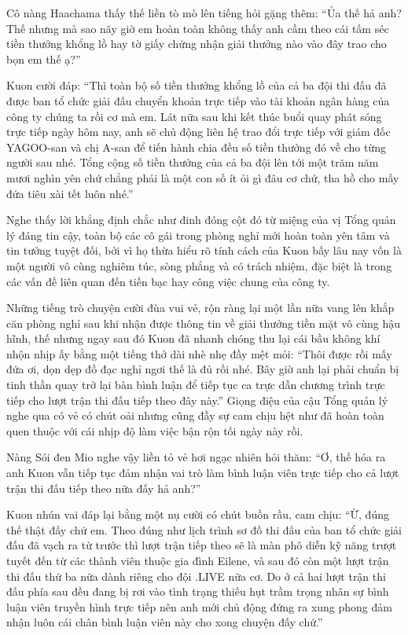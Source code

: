 \documentclass[../main.tex]{subfiles}
\begin{document}
Cô nàng Haachama thấy thế liền tò mò lên tiếng hỏi gặng thêm: ``Ủa thế hả anh? Thế nhưng mà sao nãy giờ em hoàn toàn không thấy anh cầm theo cái tấm séc tiền thưởng khổng lồ hay tờ giấy chứng nhận giải thưởng nào vào đây trao cho bọn em thế ạ?''

Kuon cười đáp: ``Thì toàn bộ số tiền thưởng khổng lồ của cả ba đội thi đấu đã được ban tổ chức giải đấu chuyển khoản trực tiếp vào tài khoản ngân hàng của công ty chúng ta rồi cơ mà em. Lát nữa sau khi kết thúc buổi quay phát sóng trực tiếp ngày hôm nay, anh sẽ chủ động liên hệ trao đổi trực tiếp với giám đốc YAGOO-san và chị A-san để tiến hành chia đều số tiền thưởng đó về cho từng người sau nhé. Tổng cộng số tiền thưởng của cả ba đội lên tới một trăm năm mươi nghìn yên chứ chẳng phải là một con số ít ỏi gì đâu cơ chứ, tha hồ cho mấy đứa tiêu xài tết luôn nhé.''

Nghe thấy lời khẳng định chắc như đinh đóng cột đó từ miệng của vị Tổng quản lý đáng tin cậy, toàn bộ các cô gái trong phòng nghỉ mới hoàn toàn yên tâm và tin tưởng tuyệt đối, bởi vì họ thừa hiểu rõ tính cách của Kuon bấy lâu nay vốn là một người vô cùng nghiêm túc, sòng phẳng và có trách nhiệm, đặc biệt là trong các vấn đề liên quan đến tiền bạc hay công việc chung của công ty.

Những tiếng trò chuyện cười đùa vui vẻ, rộn ràng lại một lần nữa vang lên khắp căn phòng nghỉ sau khi nhận được thông tin về giải thưởng tiền mặt vô cùng hậu hĩnh, thế nhưng ngay sau đó Kuon đã nhanh chóng thu lại cái bầu không khí nhộn nhịp ấy bằng một tiếng thở dài nhè nhẹ đầy mệt mỏi: ``Thôi được rồi mấy đứa ơi, dọn dẹp đồ đạc nghỉ ngơi thế là đủ rồi nhé. Bây giờ anh lại phải chuẩn bị tinh thần quay trở lại bàn bình luận để tiếp tục ca trực dẫn chương trình trực tiếp cho lượt trận thi đấu tiếp theo đây này.'' Giọng điệu của cậu Tổng quản lý nghe qua có vẻ có chút oải nhưng cũng đầy sự cam chịu hệt như đã hoàn toàn quen thuộc với cái nhịp độ làm việc bận rộn tối ngày này rồi.

Nàng Sói đen Mio nghe vậy liền tỏ vẻ hơi ngạc nhiên hỏi thăm: ``Ơ, thế hóa ra anh Kuon vẫn tiếp tục đảm nhận vai trò làm bình luận viên trực tiếp cho cả lượt trận thi đấu tiếp theo nữa đấy hả anh?''

Kuon nhún vai đáp lại bằng một nụ cười có chút buồn rầu, cam chịu: ``Ừ, đúng thế thật đấy chứ em. Theo đúng như lịch trình sơ đồ thi đấu của ban tổ chức giải đấu đã vạch ra từ trước thì lượt trận tiếp theo sẽ là màn phô diễn kỹ năng trượt tuyết đến từ các thành viên thuộc gia đình Eilene, và sau đó còn một lượt trận thi đấu thứ ba nữa dành riêng cho đội .LIVE nữa cơ. Do ở cả hai lượt trận thi đấu phía sau đều đang bị rơi vào tình trạng thiếu hụt trầm trọng nhân sự bình luận viên truyền hình trực tiếp nên anh mới chủ động đứng ra xung phong đảm nhận luôn cái chân bình luận viên này cho xong chuyện đấy chứ.''
\end{document}
